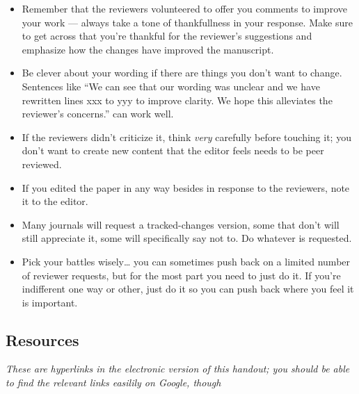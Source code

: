 \documentclass[11pt,]{article}
\begin{document}
\begin{itemize}
\itemsep1pt\parskip0pt
\item
  Remember that the reviewers volunteered to offer you comments to
  improve your work --- always take a tone of thankfullness in your
  response. Make sure to get across that you're thankful for the
  reviewer's suggestions and emphasize how the changes have improved the
  manuscript.
\item
  Be clever about your wording if there are things you don't want to
  change. Sentences like ``We can see that our wording was unclear and
  we have rewritten lines xxx to yyy to improve clarity. We hope this
  alleviates the reviewer's concerns.'' can work well.
\item
  If the reviewers didn't criticize it, think \emph{very} carefully
  before touching it; you don't want to create new content that the
  editor feels needs to be peer reviewed.
\item
  If you edited the paper in any way besides in response to the
  reviewers, note it to the editor.
\item
  Many journals will request a tracked-changes version, some that don't
  will still appreciate it, some will specifically say not to. Do
  whatever is requested.
\item
  Pick your battles wisely\ldots{} you can sometimes push back on a
  limited number of reviewer requests, but for the most part you need to
  just do it. If you're indifferent one way or other, just do it so you
  can push back where you feel it is important. \bigskip{}
\end{itemize}

\subsection{Resources}\label{resources}

\emph{These are hyperlinks in the electronic version of this handout;
you should be able to find the relevant links easilily on Google, though
}
\end{document}
